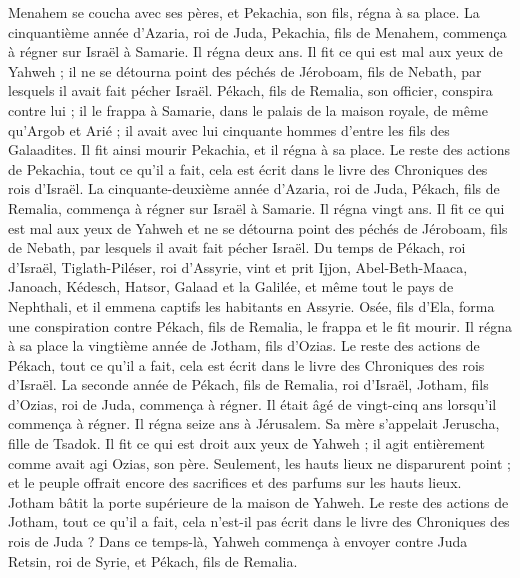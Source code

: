 \begin{multicols}{2}
Menahem se coucha avec ses pères, et Pekachia, son fils, régna à sa place.
La cinquantième année d’Azaria, roi de Juda, Pekachia, fils de Menahem, commença à régner sur Israël à Samarie. Il régna deux ans.
Il fit ce qui est mal aux yeux de Yahweh ; il ne se détourna point des péchés de Jéroboam, fils de Nebath, par lesquels il avait fait pécher Israël.
Pékach, fils de Remalia, son officier, conspira contre lui ; il le frappa à Samarie, dans le palais de la maison royale, de même qu’Argob et Arié ; il avait avec lui cinquante hommes d’entre les fils des Galaadites. Il fit ainsi mourir Pekachia, et il régna à sa place.
Le reste des actions de Pekachia, tout ce qu’il a fait, cela est écrit dans le livre des Chroniques des rois d’Israël.
La cinquante-deuxième année d’Azaria, roi de Juda, Pékach, fils de Remalia, commença à régner sur Israël à Samarie. Il régna vingt ans.
Il fit ce qui est mal aux yeux de Yahweh et ne se détourna point des péchés de Jéroboam, fils de Nebath, par lesquels il avait fait pécher Israël.
Du temps de Pékach, roi d’Israël, Tiglath-Piléser, roi d’Assyrie, vint et prit Ijjon, Abel-Beth-Maaca, Janoach, Kédesch, Hatsor, Galaad et la Galilée, et même tout le pays de Nephthali, et il emmena captifs les habitants en Assyrie.
Osée, fils d’Ela, forma une conspiration contre Pékach, fils de Remalia, le frappa et le fit mourir. Il régna à sa place la vingtième année de Jotham, fils d’Ozias.
Le reste des actions de Pékach, tout ce qu’il a fait, cela est écrit dans le livre des Chroniques des rois d’Israël.
La seconde année de Pékach, fils de Remalia, roi d’Israël, Jotham, fils d’Ozias, roi de Juda, commença à régner.
Il était âgé de vingt-cinq ans lorsqu’il commença à régner. Il régna seize ans à Jérusalem. Sa mère s’appelait Jeruscha, fille de Tsadok.
Il fit ce qui est droit aux yeux de Yahweh ; il agit entièrement comme avait agi Ozias, son père.
Seulement, les hauts lieux ne disparurent point ; et le peuple offrait encore des sacrifices et des parfums sur les hauts lieux. Jotham bâtit la porte supérieure de la maison de Yahweh.
Le reste des actions de Jotham, tout ce qu’il a fait, cela n’est-il pas écrit dans le livre des Chroniques des rois de Juda ?
Dans ce temps-là, Yahweh commença à envoyer contre Juda Retsin, roi de Syrie, et Pékach, fils de Remalia.

\end{multicols}
